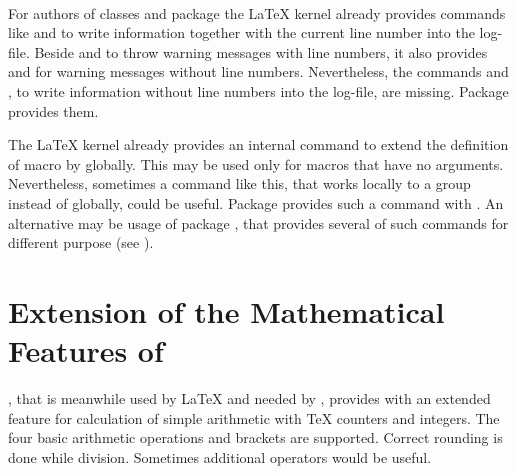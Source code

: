 \begin{Declaration}
  \\
\end{Declaration}%
%
%
For authors of classes and package the \LaTeX{} kernel already provides
commands like  and  to write information
together with the current line number into the log-file. Beside
 and  to throw warning messages with
line numbers, it also provides  and
 for warning messages without line
numbers. Nevertheless, the commands  and
, to write information without line numbers into the
log-file, are missing. Package  provides them.
%
%


\begin{Declaration}
\end{Declaration}%
%
The \LaTeX{} kernel already provides an internal command 
to extend the definition of macro  by 
globally. This may be used only for macros that have no
arguments. Nevertheless, sometimes a command like this, that works locally to
a group instead of globally, could be useful. Package 
provides such a command with . An alternative may be
usage of package , that provides
several of such commands for different purpose (see \cite{package:etoolbox}).
%


\section{Extension of the Mathematical Features of \eTeX}
\label{sec:scrbase:etex}

\eTeX{}, that is meanwhile used by \LaTeX{} and needed by \KOMAScript{},
provides with  an extended feature for
calculation of simple arithmetic with \TeX{} counters and
integers. The four basic arithmetic operations and brackets are
supported. Correct rounding is done while division. Sometimes additional
operators would be useful.

